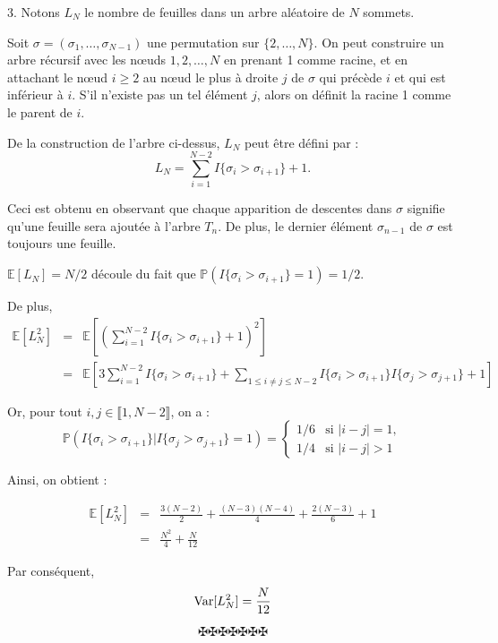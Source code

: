 3. Notons $L_N$ le nombre de feuilles dans un arbre al{\'e}atoire de $N$
sommets.

Soit $\sigma = (\sigma_1, \ldots, \sigma_{N - 1})$ une permutation sur $\{2,
\ldots, N\}$. On peut construire un arbre r{\'e}cursif avec les n{\oe}uds $1,
2, \ldots, N$ en prenant 1 comme racine, et en attachant le n{\oe}ud $i \geq
2$ au n{\oe}ud le plus {\`a} droite $j$ de $\sigma$ qui pr{\'e}c{\`e}de $i$ et
qui est inf{\'e}rieur {\`a} $i$. S'il n'existe pas un tel {\'e}l{\'e}ment $j$,
alors on d{\'e}finit la racine 1 comme le parent de $i$.

De la construction de l'arbre ci-dessus, $L_N$ peut {\^e}tre d{\'e}fini par :
\begin{equation}
  L_N = \sum_{i = 1}^{N - 2} I\{\sigma_i > \sigma_{i + 1} \}+ 1.
\end{equation}


Ceci est obtenu en observant que chaque apparition de descentes dans $\sigma$
signifie qu'une feuille sera ajout{\'e}e {\`a} l'arbre $T_n$. De plus, le
dernier {\'e}l{\'e}ment $\sigma_{n - 1}$ de $\sigma$ est toujours une feuille.

$\mathbb{E}[L_N] = N / 2$ d{\'e}coule du fait que $\mathbb{P}(I\{\sigma_i >
\sigma_{i + 1} \}= 1) = 1 / 2$.

De plus,
\begin{eqnarray*}
  \mathbb{E}[L_N^2] & = & \mathbb{E} \left[ \left( \sum_{i = 1}^{N - 2}
  I\{\sigma_i > \sigma_{i + 1} \}+ 1 \right)^2 \right]\\
  & = & \mathbb{E} \left[ 3 \sum_{i = 1}^{N - 2} I\{\sigma_i > \sigma_{i + 1}
  \}+ \sum_{1 \leqslant i \neq j \leqslant N - 2} I\{\sigma_i > \sigma_{i + 1}
  \}I\{\sigma_j > \sigma_{j + 1} \}+ 1 \right]
\end{eqnarray*}


Or, pour tout $i, j \in \llbracket 1, N - 2 \rrbracket$, on a :
\[ \mathbb{P}(I\{\sigma_i > \sigma_{i + 1} \}|I\{\sigma_j > \sigma_{j + 1} \}=
   1) = \left\{\begin{array}{ll}
     1 / 6 & \text{si } |i - j| = 1,\\
     1 / 4 & \text{si } |i - j| > 1
   \end{array}\right. \]


Ainsi, on obtient :

\[  \]
\begin{eqnarray*}
  \mathbb{E}[L_N^2] & = & \frac{3 (N - 2)}{2} + \frac{(N - 3) (N - 4)}{4} +
  \frac{2 (N - 3)}{6} + 1\\
  & = & \frac{N^2}{4} + \frac{N}{12} 
\end{eqnarray*}


Par cons{\'e}quent,
\[ \operatorname{Var} [L^2_N] = \frac{N}{12} \]

\[ \maltese \maltese \maltese \maltese \maltese \maltese \maltese \]
